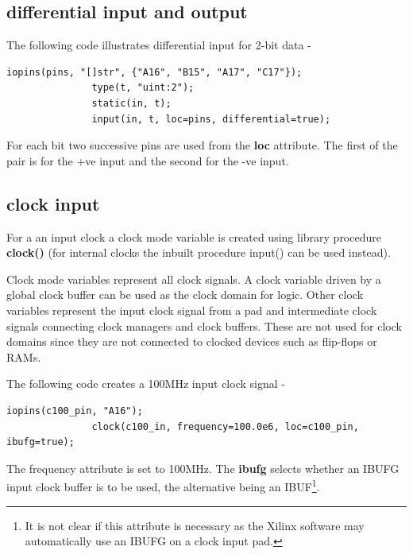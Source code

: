         \subsection{differential input and output}
        
            The following code illustrates differential input for 2-bit data -
            \begin{lstlisting}[gobble=12, language=threepl]
               iopins(pins, "[]str", {"A16", "B15", "A17", "C17"});
               type(t, "uint:2");
               static(in, t);
               input(in, t, loc=pins, differential=true);
            \end{lstlisting}
            For each bit two successive pins are used from the {\bf loc} attribute.
            The first of the pair is for the +ve input and the second for the -ve
            input.

        \subsection{clock input}
        
            For a an input clock a clock mode variable is created using library
            procedure {\bf clock()} (for internal clocks the inbuilt procedure
            input() can be used instead).
            
            Clock mode variables represent all clock signals. A clock variable
            driven by a global clock buffer can be used as the clock domain for
            logic. Other clock variables represent the input clock signal from a
            pad and intermediate clock signals connecting clock managers and clock
            buffers. These are not used for clock domains since they are not
            connected to clocked devices such as flip-flops or RAMs.
            
            The following code creates a 100MHz input clock signal -
            \begin{lstlisting}[gobble=12, language=threepl]
               iopins(c100_pin, "A16");
               clock(c100_in, frequency=100.0e6, loc=c100_pin, ibufg=true);
            \end{lstlisting}
            The frequency attribute is set to 100MHz. The {\bf ibufg} selects
            whether an IBUFG input clock buffer is to be used, the alternative
            being an IBUF\footnote{It is not clear if this attribute is
            necessary as the Xilinx software may automatically use an IBUFG
            on a clock input pad.}.
            

